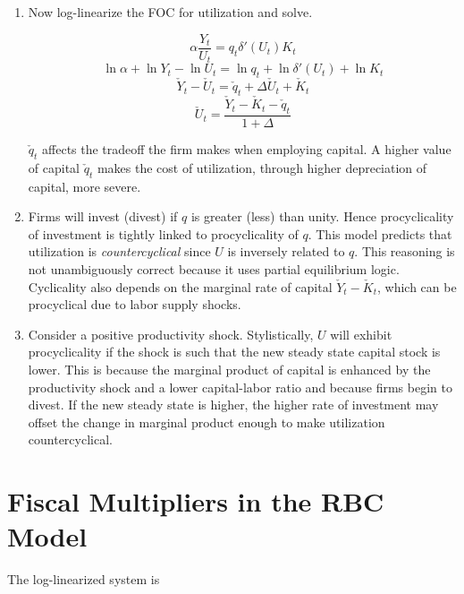 \documentclass[11pt]{article}
\begin{document}
\begin{enumerate}
        \item Now log-linearize the FOC for utilization and solve.

            $$ \alpha \frac{Y_t}{U_t} = q_t \delta'(U_t) K_t $$
            $$ \ln \alpha + \ln Y_t - \ln U_t = \ln q_t + \ln \delta'(U_t) + \ln K_t $$
            $$ \check Y_t - \check U_t = \check q_t + \Delta \check U_t + \check K_t $$
            $$ \check U_t = \frac{\check Y_t - \check K_t - \check q_t }{1 + \Delta} $$

        $\check q_t$ affects the tradeoff the firm makes when employing capital. A higher value of capital $\check q_t$ makes the cost of utilization, through higher depreciation of capital, more severe.

        \item Firms will invest (divest) if $q$ is greater (less) than unity. Hence procyclicality of investment is tightly linked to procyclicality of $q$. This model predicts that utilization is \emph{countercyclical} since $U$ is inversely related to $q$. This reasoning is not unambiguously correct because it uses partial equilibrium logic. Cyclicality also depends on the marginal rate of capital $\check Y_t - \check K_t$, which can be procyclical due to labor supply shocks.

        \item Consider a positive productivity shock. Stylistically, $U$ will exhibit procyclicality if the shock is such that the new steady state capital stock is lower. This is because the marginal product of capital is enhanced by the productivity shock and a lower capital-labor ratio and because firms begin to divest. If the new steady state is higher, the higher rate of investment may offset the change in marginal product enough to make utilization countercyclical.

    \end{enumerate}

\section{Fiscal Multipliers in the RBC Model}

    The log-linearized system is
\end{document}
